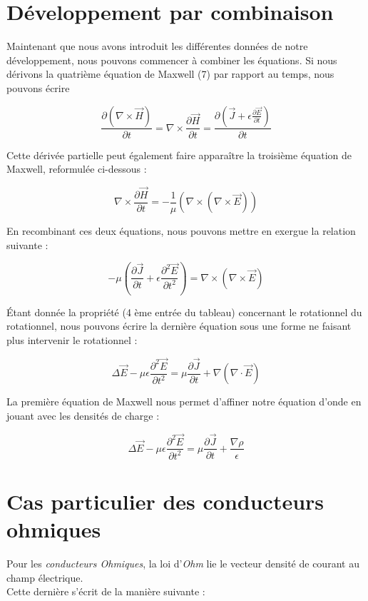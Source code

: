 \section{Développement par combinaison}

Maintenant que nous avons introduit les différentes données de notre développement, nous pouvons commencer à combiner les équations. 
Si nous dérivons la quatrième équation de Maxwell (7) par rapport au temps, nous pouvons écrire 

\[ \frac{\partial (\nabla \times \vec{H})}{\partial t} = \nabla \times \frac{\partial \vec{H}}{\partial t} = \frac{\partial(\vec{J} + \epsilon \frac{\partial \vec{E}}{\partial t})}{\partial t} \]

Cette dérivée partielle peut également faire apparaître la troisième équation de Maxwell, reformulée ci-dessous : 

\[ \nabla \times \frac{\partial \vec{H}}{\partial t} = -\frac{1}{\mu}( \nabla \times (\nabla \times \vec{E}))\]

En recombinant ces deux équations, nous pouvons mettre en exergue la relation suivante : 

\[-\mu(\frac{\partial \vec{J}}{\partial t} + \epsilon \frac{\partial^{2} \vec{E}}{\partial t^{2}}) = \nabla \times (\nabla \times \vec{E})\]

Étant donnée la propriété (4 ème entrée du tableau) concernant le rotationnel du rotationnel, 
nous pouvons écrire la dernière équation sous une forme ne faisant plus intervenir le rotationnel : 

\[ \Delta \vec{E} - \mu \epsilon  \frac{\partial^{2} \vec{E}}{\partial t^{2}} = \mu \frac{\partial \vec{J}}{\partial t} + \nabla(\nabla \cdot \vec{E}) \]

La première équation de Maxwell nous permet d'affiner notre équation d'onde en jouant avec les densités de charge : 

\[ \Delta \vec{E} - \mu \epsilon  \frac{\partial^{2} \vec{E}}{\partial t^{2}} = \mu \frac{\partial \vec{J}}{\partial t} + \frac{\nabla \rho}{\epsilon} \]

\section{Cas particulier des conducteurs ohmiques}

Pour les \textit{conducteurs Ohmiques}, la loi d'\textit{Ohm} lie le vecteur densité de courant au champ électrique. \\
Cette dernière s'écrit de la manière suivante : 


